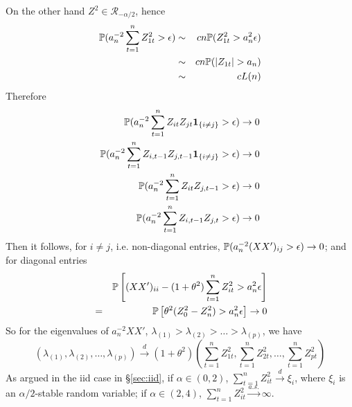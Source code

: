 \documentclass{article}
\begin{document}
On the other hand $Z^2 \in \mathcal R_{-\alpha/2}$, hence
\begin{eqnarray*}
  \P(a_n^{-2} \sum_{t=1}^n Z_{1t}^2 > \epsilon) &\sim& c n
  \P(Z_{1t}^2 > a_n^2 \epsilon) \\
  &\sim& c n \P(|Z_{1t}| > a_n) \\
  &\sim& c L(n)
\end{eqnarray*}
Therefore
\begin{eqnarray*}
  \P(a_n^{-2} \sum_{t=1}^n Z_{it} Z_{jt}\I{i \neq j} > \epsilon) \to
  0 \\
  \P(a_n^{-2} \sum_{t=1}^n Z_{i,t-1} Z_{j,t-1} \I{i \neq j} >
  \epsilon) \to 0 \\
  \P(a_n^{-2} \sum_{t=1}^n Z_{it} Z_{j,t-1} > \epsilon) \to 0
  \\
  \P(a_n^{-2} \sum_{t=1}^n Z_{i, t-1} Z_{j,t} > \epsilon) \to 0
\end{eqnarray*}
Then it follows, for $i \neq j$, i.e. non-diagonal entries,
$\P(a_n^{-2} (XX')_{ij} > \epsilon) \to 0$; and for diagonal entries
\begin{eqnarray*}
  && \P\left[(XX')_{ii} - (1 + \theta^2)\sum_{t=1}^n
      Z_{it}^2 > a_n^{2} \epsilon \right] \\
  &=& \P\left[\theta^2 ( Z_{0}^2-Z_{n}^2) > a_n^{2} \epsilon
  \right] \to 0\\
\end{eqnarray*}
So for the eigenvalues of $a_n^{-2}XX'$, $\lambda_{(1)} > \lambda_{(2)} >
\dots > \lambda_{(p)}$, we have
\[
(\lambda_{(1)}, \lambda_{(2)}, \dots, \lambda_{(p)}) \xrightarrow{d}
(1+\theta^2)(\sum_{t=1}^n Z_{1t}^2, \sum_{t=1}^n Z_{2t}^2, \dots,
\sum_{t=1}^n Z_{pt}^2)
\]
As argued in the iid case in \S\ref{sec:iid}, if $\alpha \in (0,2)$,
$\sum_{t=1}^n Z_{it}^2 \xrightarrow{d} \xi_{i}$, where $\xi_{i}$ is an
$\alpha/2$-stable random variable; if $\alpha \in (2,4)$, $\sum_{t=1}^n Z_{it}^2
\xrightarrow{a.s.} \infty$.
\end{document}
